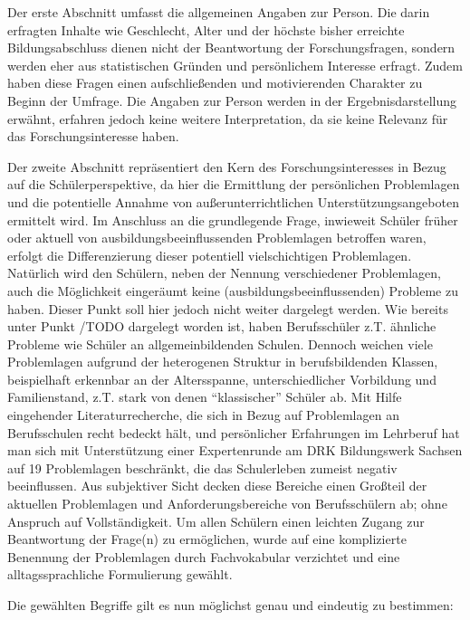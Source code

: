 Der erste Abschnitt umfasst die allgemeinen Angaben zur Person. Die darin erfragten Inhalte wie Geschlecht, Alter und der höchste bisher erreichte Bildungsabschluss dienen nicht der Beantwortung der Forschungsfragen, sondern werden eher aus statistischen Gründen und persönlichem Interesse erfragt. Zudem haben diese Fragen einen aufschließenden und motivierenden Charakter zu Beginn der Umfrage. Die Angaben zur Person werden in der Ergebnisdarstellung erwähnt, erfahren jedoch keine weitere Interpretation, da sie keine Relevanz für das Forschungsinteresse haben.

Der zweite Abschnitt repräsentiert den Kern des Forschungsinteresses in Bezug auf die Schülerperspektive, da hier die Ermittlung der persönlichen Problemlagen und die potentielle Annahme von außerunterrichtlichen Unterstützungsangeboten ermittelt wird. Im Anschluss an die grundlegende Frage, inwieweit Schüler früher oder aktuell von ausbildungsbeeinflussenden Problemlagen betroffen waren, erfolgt die Differenzierung dieser potentiell vielschichtigen Problemlagen. Natürlich wird den Schülern, neben der Nennung verschiedener Problemlagen, auch die Möglichkeit eingeräumt keine (ausbildungsbeeinflussenden) Probleme zu haben. Dieser Punkt soll hier jedoch nicht weiter dargelegt werden. Wie bereits unter Punkt /TODO dargelegt worden ist, haben Berufsschüler z.T. ähnliche Probleme wie Schüler an allgemeinbildenden Schulen. Dennoch weichen viele Problemlagen aufgrund der heterogenen Struktur in berufsbildenden Klassen, beispielhaft erkennbar an der Altersspanne, unterschiedlicher Vorbildung und Familienstand, z.T. stark von denen "`klassischer"' Schüler ab. Mit Hilfe eingehender Literaturrecherche, die sich in Bezug auf Problemlagen an Berufsschulen recht bedeckt hält, und persönlicher Erfahrungen im Lehrberuf hat man sich mit Unterstützung einer Expertenrunde am DRK Bildungswerk Sachsen auf 19 Problemlagen beschränkt, die das Schulerleben zumeist negativ beeinflussen. Aus subjektiver Sicht decken diese Bereiche einen Großteil der aktuellen Problemlagen und Anforderungsbereiche von Berufsschülern ab; ohne Anspruch auf  Vollständigkeit. Um allen Schülern einen leichten Zugang zur Beantwortung der Frage(n) zu ermöglichen, wurde auf eine komplizierte Benennung der Problemlagen durch Fachvokabular verzichtet und eine alltagssprachliche Formulierung gewählt. 

\newpage
Die gewählten Begriffe gilt es nun möglichst genau und eindeutig zu bestimmen:

